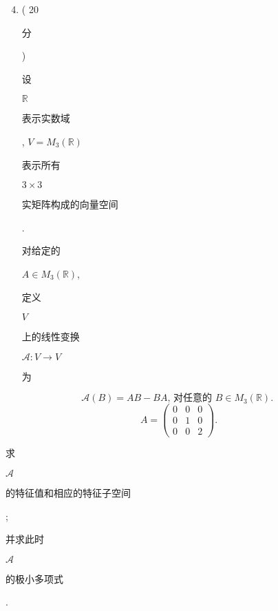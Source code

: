 \documentclass[10pt]{article}
\begin{document}
\begin{enumerate}
  \setcounter{enumi}{3}
  \item ( 20 \begin{CJK}{UTF8}{mj}分\end{CJK}) \begin{CJK}{UTF8}{mj}设\end{CJK} $\mathbb{R}$ \begin{CJK}{UTF8}{mj}表示实数域\end{CJK}, $V=M_{3}(\mathbb{R})$ \begin{CJK}{UTF8}{mj}表示所有\end{CJK} $3 \times 3$ \begin{CJK}{UTF8}{mj}实矩阵构成的向量空间\end{CJK}. \begin{CJK}{UTF8}{mj}对给定的\end{CJK} $A \in M_{3}(\mathbb{R})$, \begin{CJK}{UTF8}{mj}定义\end{CJK} $V$ \begin{CJK}{UTF8}{mj}上的线性变换\end{CJK} $\mathscr{A}: V \rightarrow V$ \begin{CJK}{UTF8}{mj}为\end{CJK}
\end{enumerate}
$$
\mathscr{A}(B)=A B-B A \text {, 对任意的 } B \in M_{3}(\mathbb{R}) \text {. }
$$
$$
A=\left(\begin{array}{lll}
0 & 0 & 0 \\
0 & 1 & 0 \\
0 & 0 & 2
\end{array}\right) .
$$
\begin{CJK}{UTF8}{mj}求\end{CJK} $\mathscr{A}$ \begin{CJK}{UTF8}{mj}的特征值和相应的特征子空间\end{CJK}; \begin{CJK}{UTF8}{mj}并求此时\end{CJK} $\mathscr{A}$ \begin{CJK}{UTF8}{mj}的极小多项式\end{CJK}.
\end{document}
